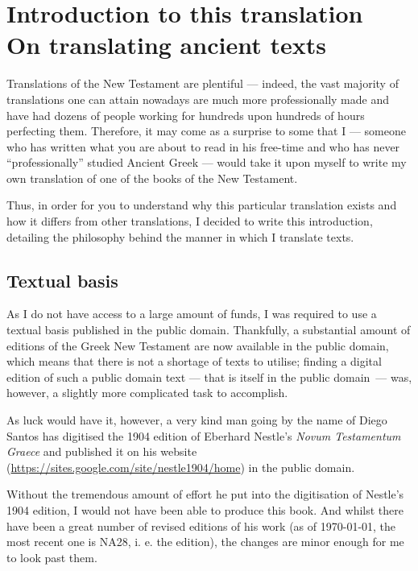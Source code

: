 \chapter*{Introduction to this translation \\ \large On translating ancient texts}
  
Translations of the New Testament are plentiful — indeed, the vast majority of translations one can attain nowadays are much more professionally made and have had dozens of people working for hundreds upon hundreds of hours perfecting them. Therefore, it may come as a surprise to some that I — someone who has written what you are about to read in his free-time and who has never “professionally” studied Ancient Greek — would take it upon myself to write my own translation of one of the books of the New Testament. 

Thus, in order for you to understand why this particular translation exists and how it differs from other translations, I decided to write this introduction, detailing the philosophy behind the manner in which I translate texts.

\section*{Textual basis}
As I do not have access to a large amount of funds, I was required to use a textual basis published in the public domain. Thankfully, a substantial amount of editions of the Greek New Testament are now available in the public domain, which means that there is not a shortage of texts to utilise; finding a digital edition of such a public domain text — that is itself in the public domain — was, however, a slightly more complicated task to accomplish. 

As luck would have it, however, a very kind man going by the name of Diego Santos has digitised the 1904 edition of Eberhard Nestle's \textit{Novum Testamentum Graece} and published it on his website (\url{https://sites.google.com/site/nestle1904/home}) in the public domain.

Without the tremendous amount of effort he put into the digitisation of Nestle's 1904 edition, I would not have been able to produce this book. And whilst there have been a great number of revised editions of his work (as of \today, the most recent one is NA28, i. e. the  edition), the changes are minor enough for me to look past them. 

